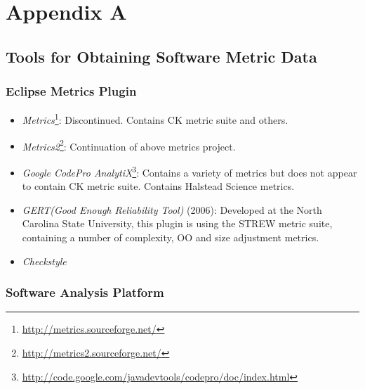\chapter{Appendix A}

\section{Tools for Obtaining Software Metric Data}

\subsection{Eclipse Metrics Plugin}

\begin{itemize}

	\item \textit{Metrics}\footnote{\url{http://metrics.sourceforge.net/}}: Discontinued. Contains CK metric suite and others.

	\item\textit{Metrics2}\footnote{\url{http://metrics2.sourceforge.net/}}:  Continuation of above metrics project.

	\item \textit{Google CodePro AnalytiX}\footnote{\url{http://code.google.com/javadevtools/codepro/doc/index.html}}: Contains a variety of metrics but does not appear to contain CK metric suite. Contains Halstead Science metrics.

	\item \textit{GERT(Good Enough Reliability Tool)} (2006): Developed at the North Carolina State University, this plugin is using the STREW metric suite, containing a number of complexity, OO and size adjustment metrics.

	\item \textit{Checkstyle}

\end{itemize}

\subsection{Software Analysis Platform} 

